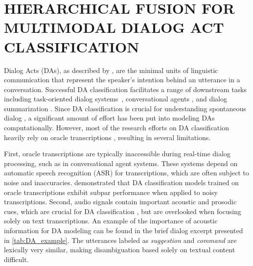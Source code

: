 \pagestyle{plain} %


\chapter{\uppercase {Hierarchical Fusion for Multimodal Dialog Act Classification}}

Dialog Acts (DAs), as described by \cite{searle_1969}, are the minimal units of linguistic communication that represent the speaker's intention behind an utterance in a conversation. Successful DA classification facilitates a range of downstream tasks including task-oriented dialog systems~\cite{blache-etal-2020-two, wang-etal-2020-multi-domain}, conversational agents \cite{ 10.1145/3331184.3331375, 10.1145/3387940.3391487}, and dialog summarization \cite{oya-carenini-2014-extractive, Goo2018AbstractiveDS}. Since DA classification is crucial for understanding spontaneous dialog \cite{stolcke-etal-2000-dialogue}, a significant amount of effort has been put into modeling DAs computationally. However, most of the research efforts on DA classification heavily rely on oracle transcriptions \cite{ortega-vu-2017-neural, 10.1145/3209978.3209997, li-etal-2019-dual, DBLP:journals/corr/abs-2002-08801, he-etal-2021-speaker-turn}, resulting in several limitations.

First, oracle transcriptions are typically inaccessible during real-time dialog processing, such as in conversational agent systems. These systems depend on automatic speech recognition (ASR) for transcriptions, which are often subject to noise and inaccuracies.
\cite{8682881} demonstrated that DA classification models trained on oracle transcriptions exhibit subpar performance when applied to noisy transcriptions. Second, audio signals contain important acoustic and prosodic cues, which are crucial for DA classification \cite{jurafsky-etal-1998-lexical}, but are overlooked when focusing solely on text transcriptions. An example of the importance of acoustic information for DA modeling can be found in the brief dialog excerpt presented in \autoref{tab:DA_example}. The utterances labeled as \textit{suggestion} and \textit{command} are lexically very similar, making disambiguation based solely on textual content difficult.

